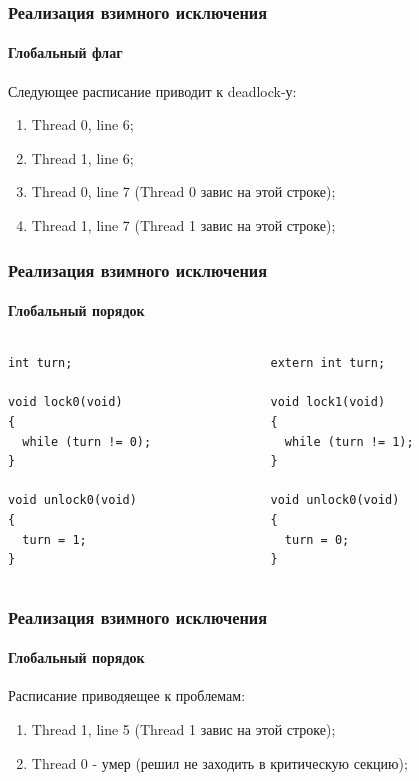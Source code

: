 \begin{frame}
\frametitle{Реализация взимного исключения}
\framesubtitle{Глобальный флаг}

Следующее расписание приводит к deadlock-у:
\begin{enumerate}
  \item Thread 0, line 6;
  \item Thread 1, line 6;
  \item Thread 0, line 7 (Thread 0 завис на этой строке);
  \item Thread 1, line 7 (Thread 1 завис на этой строке);
\end{enumerate}
\end{frame}

\begin{frame}[fragile]
\frametitle{Реализация взимного исключения}
\framesubtitle{Глобальный порядок}

\begin{columns}[T]
  \begin{column}{.45\linewidth}
    \begin{lstlisting}
int turn;

void lock0(void)
{
  while (turn != 0);
}

void unlock0(void)
{
  turn = 1;
}
    \end{lstlisting}
  \end{column}
  \begin{column}{.45\linewidth}
    \begin{lstlisting}
extern int turn;

void lock1(void)
{
  while (turn != 1);
}

void unlock0(void)
{
  turn = 0;
}
    \end{lstlisting}
  \end{column}
\end{columns}
\end{frame}

\begin{frame}
\frametitle{Реализация взимного исключения}
\framesubtitle{Глобальный порядок}

Расписание приводяещее к проблемам:
\begin{enumerate}
  \item Thread 1, line 5 (Thread 1 завис на этой строке);
  \item Thread 0 - умер (решил не заходить в критическую секцию);
\end{enumerate}
\end{frame}

